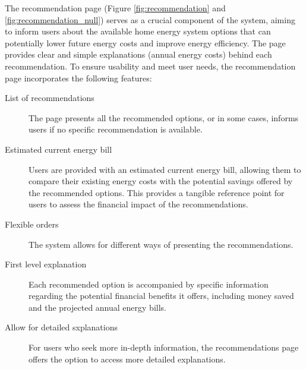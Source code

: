 The recommendation page (Figure \ref{fig:recommendation} and \ref{fig:recommendation_null}) serves as a crucial component of the system, aiming to inform users about the available home energy system options that can potentially lower future energy costs and improve energy efficiency. 
The page provides clear and simple explanations (annual energy costs) behind each recommendation.
To ensure usability and meet user needs, the recommendation page incorporates the following features:
\begin{description}
  \item[List of recommendations] The page presents all the recommended options, or in some cases, informs users if no specific recommendation is available. 
  \item[Estimated current energy bill]  Users are provided with an estimated current energy bill, allowing them to compare their existing energy costs with the potential savings offered by the recommended options. This provides a tangible reference point for users to assess the financial impact of the recommendations.
  \item[Flexible orders] The system allows for different ways of presenting the recommendations. 
  \item[First level explanation] Each recommended option is accompanied by specific information regarding the potential financial benefits it offers, including money saved and the projected annual energy bills. 
  \item[Allow for detailed sxplanations] For users who seek more in-depth information, the recommendations page offers the option to access more detailed explanations. 
\end{description}

